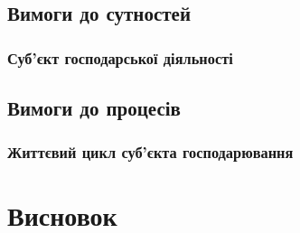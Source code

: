 \documentclass{article}
\begin{document}
\subsection{Вимоги до сутностей}

\subsubsection{Суб'єкт господарської діяльності}

\subsection{Вимоги до процесів}

\subsubsection{Життєвий цикл суб'єкта господарювання}

\newpage
\section*{Висновок}
\end{document}
